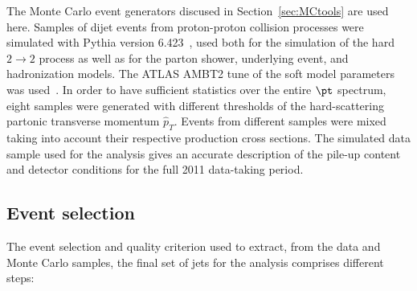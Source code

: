 The Monte Carlo event generators discused in Section~\ref{sec:MCtools} are used here. Samples of dijet events from proton-proton collision processes were simulated with {\sc Pythia} version 6.423~\cite{PYTHIA6}, used both for the simulation of the hard $2\rightarrow 2$ process as well as for the parton shower, underlying event, and hadronization models. The ATLAS AMBT2 tune of the soft model parameters was used~\cite{Pythia_MC11tune}.
In order to have sufficient statistics over the entire $\pt$ spectrum, eight samples were generated with different thresholds of the hard-scattering partonic transverse momentum $\hat{p}_T$. Events from different samples were mixed taking into account their respective production cross sections.
The simulated data sample used for the analysis %
gives an accurate description of the pile-up content and detector conditions for the full 2011 data-taking period. 



\subsection{Event selection}\label{sec:EventSelection}

The event selection and quality criterion used to extract, from the data and Monte Carlo samples, the final set of jets for the analysis comprises different steps: 

